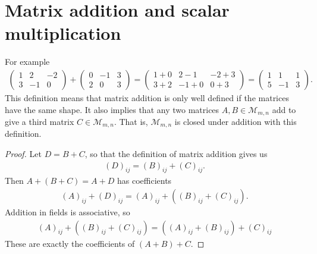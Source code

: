 \section{Matrix addition and scalar multiplication}



\noindent For example
\begin{align*}
\begin{pmatrix}
1 &  2 & -2 \\
3 & -1 & 0   
\end{pmatrix}
+
\begin{pmatrix}
0 & -1 & 3 \\
2 &  0 & 3   
\end{pmatrix}
=
\begin{pmatrix}
1+0 & 2-1 & -2+3 \\
3+2 & -1+0 & 0+3   
\end{pmatrix}
=
\begin{pmatrix}
1 &  1 & 1 \\
5 & -1 & 3   
\end{pmatrix}.
\end{align*}
This definition means that matrix addition is only well defined if the matrices have the same shape. It also implies that any two matrices $A,B \in \mathcal{M}_{m,n}$ add to give a third matrix $C \in \mathcal{M}_{m,n}$. That is, $\mathcal{M}_{m,n}$ is closed under addition with this definition.


\begin{proof}
Let $D = B + C$, so that the definition of matrix addition gives us 
\begin{align*}
(D)_{ij}=(B)_{ij} + (C)_{ij}.
\end{align*}
Then $A + (B + C)= A + D$ has coefficients 
\begin{align*}
(A)_{ij} + (D)_{ij} = (A)_{ij} + ((B)_{ij} + (C)_{ij}).
\end{align*}
Addition in fields is associative, so
\begin{align*}
(A)_{ij} + ((B)_{ij} + (C)_{ij}) = ((A)_{ij} + (B)_{ij}) + (C)_{ij}
\end{align*}
These are exactly the coefficients of $(A+B)+C$.
\end{proof}

